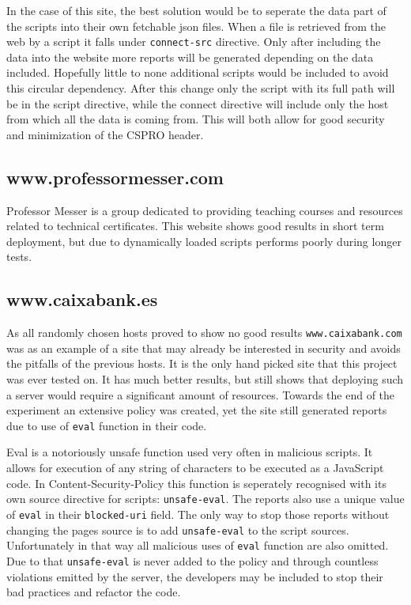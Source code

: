 \begin{description}
In the case of this site, the best solution would be to seperate the data part of the scripts into their own fetchable json files.
When a file is retrieved from the web by a script it falls under \texttt{connect-src} directive. 
Only after including the data into the website more reports will be generated depending on the data included.
Hopefully little to none additional scripts would be included to avoid this circular dependency.
After this change only the script with its full path will be in the script directive, while the connect directive will include only the host from which all the data is coming from.
This will both allow for good security and minimization of the CSPRO header.

\subsection{www.professormesser.com}

Professor Messer is a group dedicated to providing teaching courses and resources related to technical certificates.
This website shows good results in short term deployment, but due to dynamically loaded scripts performs poorly during longer tests.


\subsection{www.caixabank.es}

As all randomly chosen hosts proved to show no good results \texttt{www.caixabank.com} was as an example of a site that may already be interested in security and avoids the pitfalls of the previous hosts.
It is the only hand picked site that this project was ever tested on. 
It has much better results, but still shows that deploying such a server would require a significant amount of resources.
Towards the end of the experiment an extensive policy was created, yet the site still generated reports due to use of \texttt{eval} function in their code.

Eval is a notoriously unsafe function used very often in malicious scripts. 
It allows for execution of any string of characters to be executed as a JavaScript code. 
In Content-Security-Policy this function is seperately recognised with its own source directive for scripts: \texttt{unsafe-eval}.
The reports also use a unique value of \texttt{eval} in their \texttt{blocked-uri} field.
The only way to stop those reports without changing the pages source is to add \texttt{unsafe-eval} to the script sources.
Unfortunately in that way all malicious uses of \texttt{eval} function are also omitted.
Due to that \texttt{unsafe-eval} is never added to the policy and through countless violations emitted by the server, the developers may be included to stop their bad practices and refactor the code.


\end{description}
